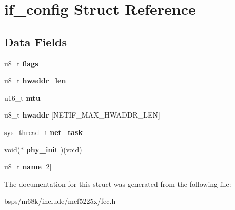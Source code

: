 \hypertarget{structif__config}{}\section{if\+\_\+config Struct Reference}
\label{structif__config}
\subsection*{Data Fields}
\begin{DoxyCompactItemize}
\item 
\mbox{\label{structif__config_a9a9551adcbcf890c5f3ac087b0293f0e}} 
u8\+\_\+t {\bfseries flags}
\item 
\mbox{\label{structif__config_acaa208a8936778e0ea1326a59b45c615}} 
u8\+\_\+t {\bfseries hwaddr\+\_\+len}
\item 
\mbox{\label{structif__config_aa656b20cc3ff80717a937364c4e4f625}} 
u16\+\_\+t {\bfseries mtu}
\item 
\mbox{\label{structif__config_a0c8c42984faae8e7c6497e64082c6729}} 
u8\+\_\+t {\bfseries hwaddr} \mbox{[}N\+E\+T\+I\+F\+\_\+\+M\+A\+X\+\_\+\+H\+W\+A\+D\+D\+R\+\_\+\+L\+EN\mbox{]}
\item 
\mbox{\label{structif__config_af976d5dbabae6b76829e645dbcf0c2e9}} 
sys\+\_\+thread\+\_\+t {\bfseries net\+\_\+task}
\item 
\mbox{\label{structif__config_a1774d46214f8ae619dc90ea53849920f}} 
void($\ast$ {\bfseries phy\+\_\+init} )(void)
\item 
\mbox{\label{structif__config_abe4ff26cdf7347d82f7c7672367f2cf5}} 
u8\+\_\+t {\bfseries name} \mbox{[}2\mbox{]}
\end{DoxyCompactItemize}


The documentation for this struct was generated from the following file\+:\begin{DoxyCompactItemize}
\item 
bsps/m68k/include/mcf5225x/fec.\+h\end{DoxyCompactItemize}
